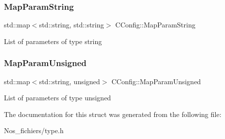 \subsubsection{\texorpdfstring{Map\+Param\+String}{MapParamString}}
{\footnotesize\ttfamily std\+::map$<$std\+::string, std\+::string$>$ C\+Config\+::\+Map\+Param\+String}

List of parameters of type string \mbox{\label{struct_c_config_a7ea31231c0cd120f6ac5b7390bfded2d}} 
\subsubsection{\texorpdfstring{Map\+Param\+Unsigned}{MapParamUnsigned}}
{\footnotesize\ttfamily std\+::map$<$std\+::string, unsigned$>$ C\+Config\+::\+Map\+Param\+Unsigned}

List of parameters of type unsigned 

The documentation for this struct was generated from the following file\+:\begin{DoxyCompactItemize}
\item 
Nos\+\_\+fichiers/type.\+h\end{DoxyCompactItemize}
